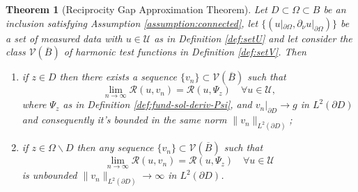 \documentclass[10pt, a4paper, twoside, openright]{book}
\theoremstyle{definition}
\theoremstyle{plain}
\newtheorem{theorem}[subsection]{Theorem}
\theoremstyle{plain}
\theoremstyle{plain}
\theoremstyle{plain}
\theoremstyle{plain}
\theoremstyle{plain}
\theoremstyle{plain}
\theoremstyle{plain}
\begin{document}
\begin{theorem}[Reciprocity Gap Approximation Theorem]
 \label{theo:approximation-rg} 
 Let $D\subset\Omega\subset B$  be an inclusion satisfying Assumption \ref{assumption:connected}, let $\{(u|_{\partial \Omega},\partial_\nu u|_{\partial \Omega})\}$ 
 be a set of measured data with $u\in\mathcal{U}$ as in Definition \ref{def:setU} and 
 let consider the class $\mathcal{V}(\overline{B})$ of harmonic test functions 
 in Definition \ref{def:setV}. Then
 \begin{enumerate}
  \item if $z \in D$ then there exists a sequence $\{v_n\} \subset \mathcal{V}(\overline{B})$ such that
   \begin{equation}
     \lim_{n\to\infty}\mathcal{R}(u,v_n) = \mathcal{R}(u,\Psi_z)\quad\forall u\in\mathcal{U},\label{eq:rg-lim-constructive}
   \end{equation}
   where $\Psi_z$ as in Definition \ref{def:fund-sol-deriv-Psi}, and $v_n|_{\partial D}\to g$ in $L^2(\partial D)$ and consequently  it's bounded in the same norm $\|v_n\|_{L^2(\partial D)}$;
  \item if $z \in \Omega \backslash D$ then any sequence $\{v_n\} \subset \mathcal{V}(\overline{B})$ such that
   \begin{equation}
     \lim_{n\to\infty}\mathcal{R}(u,v_n) = \mathcal{R}(u,\Psi_z)\quad\forall u\in\mathcal{U}\label{eq:rg-lim-counterpart}
   \end{equation}
   is unbounded $\|v_n\|_{L^2(\partial D)}\to\infty$ in $L^2(\partial D)$.
 \end{enumerate}
\end{theorem}
\end{document}
